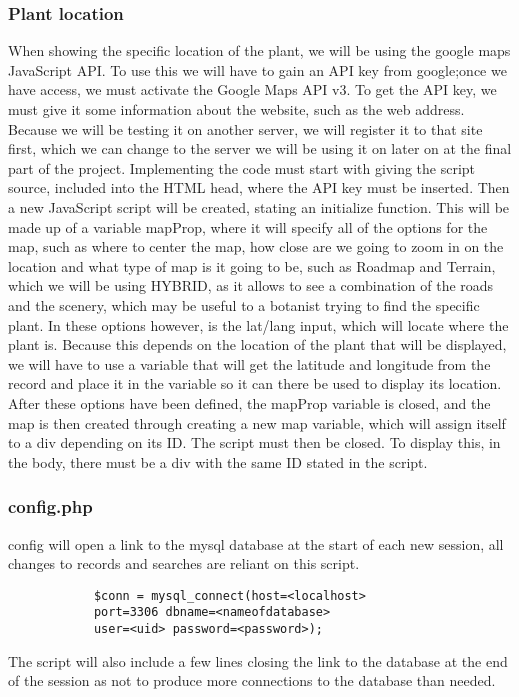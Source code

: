 	\subsubsection{Plant location}
		When showing the specific location of the plant, we will be using the google maps JavaScript API. To use this we will have to gain an API key from google;once we have access, we must activate the Google Maps API v3. To get the API key, we must give it some information about the website, such as the web address. Because we will be testing it on another server, we will register it to that site first, which we can change to the server we will be using it on later on at the final part of the project.
		Implementing the code must start with giving the script source, included into the HTML head, where the API key must be inserted.  Then a new JavaScript script will be created, stating an initialize function. This will be made up of a variable mapProp, where it will specify all of the options for the map, such as where to center the map, how close are we going to zoom in on the location and what type of map is it going to be, such as Roadmap and Terrain, which we will be using HYBRID, as it allows to see a combination of the roads and the scenery, which may be useful to a botanist trying to find the specific plant. In these options however, is the lat/lang input, which will locate where the plant is. Because this depends on the location of the plant that will be displayed, we will have to use a variable that will get the latitude and longitude from the record and place it in the variable so it can there be used to display its location. After these options have been defined, the mapProp variable is closed, and the map is then created through creating a new map variable, which will assign itself to a div depending on its ID. The script must then be closed. To display this, in the body, there must be a div with the same ID stated in the script. 

	\subsubsection{config.php}
		config will open a link to the mysql database at the start of each new session, all changes to records and searches are reliant on this script.
		\begin{verbatim}
			$conn = mysql_connect(host=<localhost> 
			port=3306 dbname=<nameofdatabase> 
			user=<uid> password=<password>);
		\end{verbatim}
		The script will also include a few lines closing the link to the database at the end of the session as not to produce more connections to the database than needed.

